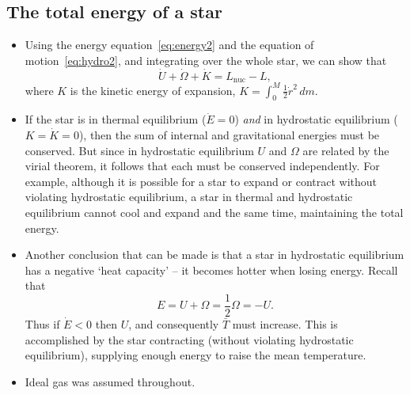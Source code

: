 \documentclass[]{article}
\begin{document}
\subsection{The total energy of a star}
\begin{itemize}
\item Using the energy equation~\eqref{eq:energy2} and the equation of
motion~\eqref{eq:hydro2}, and integrating over the whole star, we can show that
\begin{equation}\label{eq:totalenergy}
\dot{U} + \dot{\Omega} + \dot{{K}} = L_\text{nuc} - L,
\end{equation}
where $K$ is the kinetic energy of expansion,
$K = \int_0^M\frac{1}{2}\dot{r}^2\,dm$.

\item If the star is in thermal equilibrium ($\dot{E}=0$) \emph{and} in
hydrostatic equilibrium ($K=\dot{K}=0$), then the sum of internal and
gravitational energies must be conserved. But since in hydrostatic equilibrium
$U$ and $\Omega$ are related by the virial theorem, it follows that each must be
conserved independently. For example, although it is possible for a star to
expand or contract without violating hydrostatic equilibrium, a star in thermal
and hydrostatic equilibrium cannot cool and expand and the same time,
maintaining the total energy.

\item Another conclusion that can be made is that a star in hydrostatic
equilibrium has a negative `heat capacity' -- it becomes hotter when losing
energy. Recall that
\begin{equation}
E = U + \Omega = \frac{1}{2}\Omega = -U.
\end{equation}
Thus if $\dot{E}<0$ then $U$, and consequently $\bar{T}$ must increase. This is
accomplished by the star contracting (without violating hydrostatic
equilibrium), supplying enough energy to raise the mean temperature.

\item Ideal gas was assumed throughout.
\end{itemize}
\end{document}
